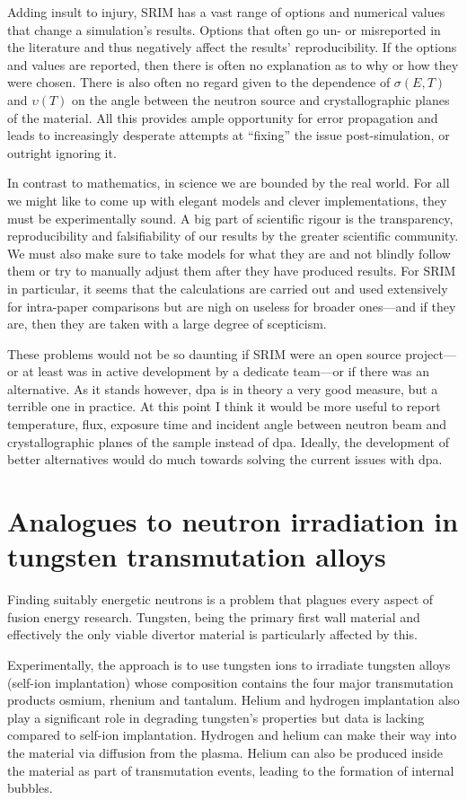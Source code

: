 \documentclass[12pt, a4paper]{article}
\begin{document}
		Adding insult to injury, SRIM has a vast range of options and numerical values that change a simulation's results. Options that often go un- or misreported in the literature and thus negatively affect the results' reproducibility. If the options and values are reported, then there is often no explanation as to why or how they were chosen. There is also often no regard given to the dependence of $\sigma (E,T)$ and $\upsilon (T)$ on the angle between the neutron source and crystallographic planes of the material. All this provides ample opportunity for error propagation and leads to increasingly desperate attempts at ``fixing'' the issue post-simulation, or outright ignoring it.
		
		In contrast to mathematics, in science we are bounded by the real world. For all we might like to come up with elegant models and clever implementations, they must be experimentally sound. A big part of scientific rigour is the transparency, reproducibility and falsifiability of our results by the greater scientific community. We must also make sure to take models for what they are and not blindly follow them or try to manually adjust them after they have produced results. For SRIM in particular, it seems that the calculations are carried out and used extensively for intra-paper comparisons but are nigh on useless for broader ones---and if they are, then they are taken with a large degree of scepticism.
		
		These problems would not be so daunting if SRIM were an open source project---or at least was in active development by a dedicate team---or if there was an alternative. As it stands however, dpa is in theory a very good measure, but a terrible one in practice. At this point I think it would be more useful to report temperature, flux, exposure time and incident angle between neutron beam and crystallographic planes of the sample instead of dpa. Ideally, the development of better alternatives would do much towards solving the current issues with dpa.
		\section{Analogues to neutron irradiation in tungsten transmutation alloys}\label{s:ni}
		Finding suitably energetic neutrons is a problem that plagues every aspect of fusion energy research. Tungsten, being the primary first wall material and effectively the only viable divertor material is particularly affected by this. 
		
		Experimentally, the approach is to use tungsten ions to irradiate tungsten alloys (self-ion implantation) whose composition contains the four major transmutation products osmium, rhenium and tantalum. Helium and hydrogen implantation also play a significant role in degrading tungsten's properties but data is lacking compared to self-ion implantation. Hydrogen and helium can make their way into the material via diffusion from the plasma. Helium can also be produced inside the material as part of transmutation events, leading to the formation of internal bubbles. 
		
\end{document}
